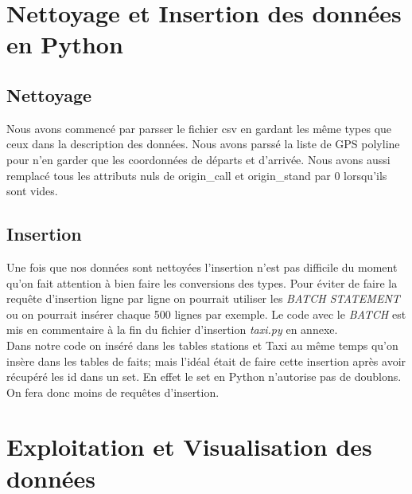 \documentclass[]{report}
\begin{document}
	
	\section{Nettoyage et Insertion des données en Python}
	\subsection{Nettoyage}
	Nous avons commencé par parsser le fichier csv en gardant les même types que ceux dans la description des données.  Nous avons parssé la liste de GPS polyline pour n'en garder que les coordonnées de départs et d'arrivée. Nous avons aussi remplacé tous les attributs nuls de origin\_call et origin\_stand par 0 lorsqu'ils sont vides.
	\subsection{Insertion}
	Une fois que nos données sont nettoyées l'insertion n'est pas difficile du moment qu'on fait attention à bien faire les conversions des types. Pour éviter de faire la requête d'insertion ligne par ligne on pourrait utiliser les \textit{BATCH STATEMENT} ou on pourrait insérer chaque 500 lignes par exemple. Le code avec le \textit{BATCH} est mis en commentaire à la fin du fichier d'insertion \textit{taxi.py} en annexe. \\
	Dans notre code on inséré dans les tables stations et Taxi au même temps qu'on insère dans les tables de faits; mais l'idéal était de faire cette insertion après avoir récupéré les id dans un set. En effet le set en Python n'autorise pas de doublons. On fera donc moins de requêtes d'insertion.
	
	
	\section{Exploitation et Visualisation des données}
\end{document}
